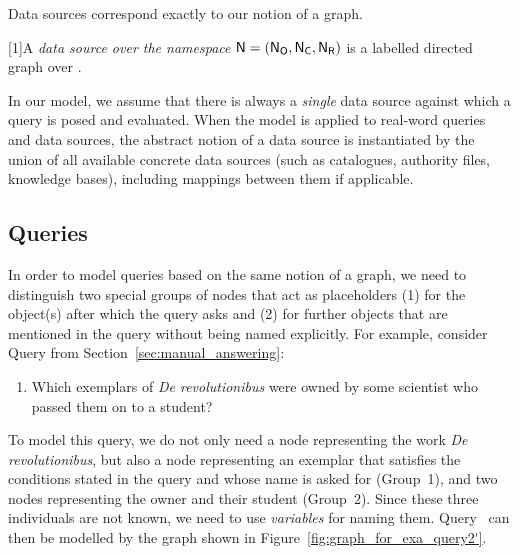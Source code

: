 Data sources correspond exactly to our notion of a graph.
%
\begin{definition}
  \label{def:data_source}
  \scalebox{0.965}[1]{A \emph{data source over the namespace $\textup{\textsf{N}}=(\mathsf{N}_\mathsf{O},\mathsf{N}_\mathsf{C},\mathsf{N}_\mathsf{R})$} is a labelled directed graph
  over \namespace.}
\end{definition}
%
In our model, we assume that there is always a \emph{single} data source against which a query is posed and evaluated.
When the model is applied to real-word queries and data sources,
the abstract notion of a data source is instantiated by the union of
all available concrete data sources (such as catalogues, authority files, knowledge bases),
including mappings between them if applicable.

\subsection{Queries}

In order to model queries based on the same notion of a graph, we need to distinguish
two special groups of nodes that act as placeholders (1) for the object(s) after which the query asks
and (2) for further objects that are mentioned in the query without being named explicitly.
For example, consider Query  from Section~\ref{sec:manual_answering}:
%
\begin{enumerate}
  \item[\exaquery{2$'$}]
    Which exemplars of \emph{De revolutionibus} were owned by some scientist who passed them on to a student?
\end{enumerate}
%
To model this query, we do not only need a node representing the work \emph{De revolutionibus},
but also a node representing an exemplar that satisfies the conditions stated in the query and whose name is asked for (Group~1),
and two nodes representing the owner and their student (Group~2).
Since these three individuals are not known, we need to use \emph{variables} for naming them.
Query~
can then be modelled by the graph shown in Figure~\ref{fig:graph_for_exa_query2'}.

